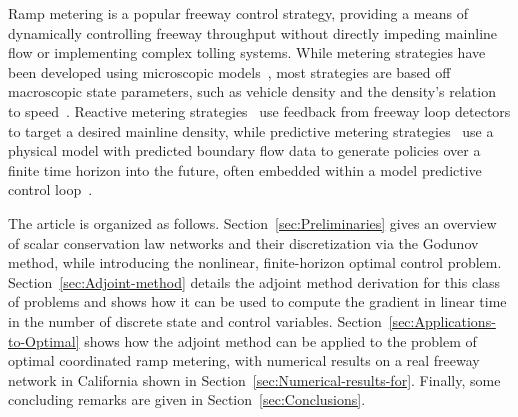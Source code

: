 Ramp metering is a popular freeway control strategy, providing a means of dynamically controlling freeway throughput without directly impeding mainline flow or implementing complex tolling systems. While metering strategies have been developed using microscopic models~\cite{Ben-Akiva2003}, most strategies are based off macroscopic state parameters, such as vehicle density and the density's relation to speed~\cite{richards1956shock,lighthill1955kinematic,daganzo1995cell}. Reactive metering strategies~\cite{Papageorgiou1991,Papamichail,Kachroo2003} use feedback from freeway loop detectors to target a desired mainline density, while predictive metering strategies~\cite{Frejo2011,Kotsialos2004,gomes2006optimal,Chen1997} use a physical model with predicted boundary flow data to generate policies over a finite time horizon into the future, often embedded within a model predictive control loop~\cite{Muralidharana}.

The article is organized as follows. Section~\ref{sec:Preliminaries} gives an overview of scalar conservation law networks and their discretization via the Godunov method, while introducing the nonlinear, finite-horizon optimal control problem. Section~\ref{sec:Adjoint-method} details the adjoint method derivation for this class of problems and shows how it can be used to compute the gradient in linear time in the number of discrete state and control variables.  Section~\ref{sec:Applications-to-Optimal} shows how the adjoint method can be applied to the problem of optimal coordinated ramp metering, with numerical results on a real freeway network in California shown in Section~\ref{sec:Numerical-results-for}. Finally, some concluding remarks are given in Section~\ref{sec:Conclusions}.